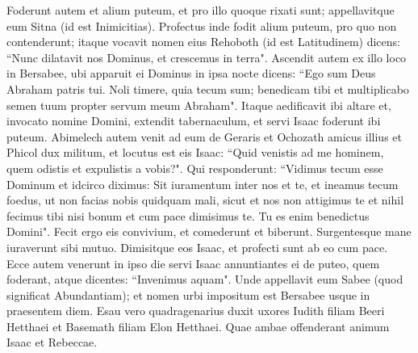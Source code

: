 \begin{biblechapter}
\verse Foderunt autem et alium puteum, et pro illo quoque rixati sunt; appellavitque eum Sitna (id est Inimicitias). 
\verse Profectus inde fodit alium puteum, pro quo non contenderunt; itaque vocavit nomen eius Rehoboth (id est Latitudinem) dicens: “Nunc dilatavit nos Dominus, et crescemus in terra". 
\verse Ascendit autem ex illo loco in Bersabee, 
\verse ubi apparuit ei Dominus in ipsa nocte dicens: “Ego sum Deus Abraham patris tui. Noli timere, quia tecum sum; benedicam tibi et multiplicabo semen tuum propter servum meum Abraham". 
\verse Itaque aedificavit ibi altare et, invocato nomine Domini, extendit tabernaculum, et servi Isaac foderunt ibi puteum. 
\verse Abimelech autem venit ad eum de Geraris et Ochozath amicus illius et Phicol dux militum, 
\verse et locutus est eis Isaac: “Quid venistis ad me hominem, quem odistis et expulistis a vobis?". 
\verse Qui responderunt: “Vidimus tecum esse Dominum et idcirco diximus: Sit iuramentum inter nos et te, et ineamus tecum foedus, 
\verse ut non facias nobis quidquam mali, sicut et nos non attigimus te et nihil fecimus tibi nisi bonum et cum pace dimisimus te. Tu es enim benedictus Domini". 
\verse Fecit ergo eis convivium, et comederunt et biberunt. 
\verse Surgentesque mane iuraverunt sibi mutuo. Dimisitque eos Isaac, et profecti sunt ab eo cum pace. 
\verse Ecce autem venerunt in ipso die servi Isaac annuntiantes ei de puteo, quem foderant, atque dicentes: “Invenimus aquam". 
\verse Unde appellavit eum Sabee (quod significat Abundantiam); et nomen urbi impositum est Bersabee usque in praesentem diem. 
\verse Esau vero quadragenarius duxit uxores Iudith filiam Beeri Hetthaei et Basemath filiam Elon Hetthaei. 
\verse Quae ambae offenderant animum Isaac et Rebeccae. 
\end{biblechapter}

